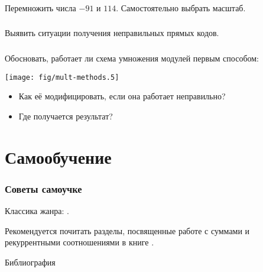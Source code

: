 \begin{frame}
    \frametitle{\TaskSimpleNumber}
    Перемножить числа $-91$ и $114$. Самостоятельно выбрать масштаб.
\end{frame}

\begin{frame}
    \frametitle{\TaskSimpleNumber}
    Выявить ситуации получения неправильных прямых кодов.
\end{frame}

\begin{frame}
    \frametitle{\TaskSimpleNumber}
    Обосновать, работает ли схема умножения модулей первым способом:
    \begin{center}
        \texttt{[image: fig/mult-methods.5]}
    \end{center}
    
    \begin{itemize}
        \item Как её модифицировать, если она работает неправильно?
        \item Где получается результат?
    \end{itemize}
\end{frame}

\section{Самообучение}

\begin{frame}
    \frametitle{Советы самоучке}
    
    Классика жанра: \cite{bib:lisikov:automateBase,bib:saveliev:automateTheory}.

    Рекомендуется почитать разделы, посвященные работе с суммами и рекуррентными соотношениями в книге \cite{bib:knuth:concretemath}.
\end{frame}

\begin{frame}[allowframebreaks]{Библиография}
    
    
\end{frame}

